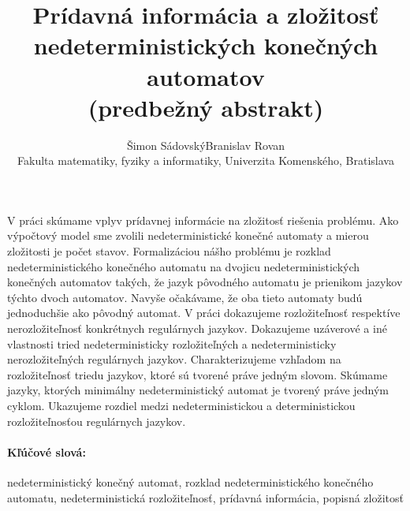 \documentclass[11pt,a4paper]{article}
\begin{document}
\thispagestyle{empty}

\title{\textbf{Prídavná informácia a zložitosť nedeterministických konečných automatov} \\ 
(predbežný abstrakt)}
\author{Šimon Sádovský\quad Branislav Rovan\\
Fakulta matematiky, fyziky a informatiky, Univerzita Komenského, Bratislava}
\date{} %
\maketitle\thispagestyle{empty} %

V práci skúmame vplyv prídavnej informácie na zložitosť riešenia problému. Ako výpočtový model sme zvolili nedeterministické konečné automaty a mierou zložitosti je počet stavov. Formalizáciou nášho problému je rozklad nedeterministického konečného automatu na dvojicu nedeterministických konečných automatov takých, že jazyk pôvodného automatu je prienikom jazykov týchto dvoch automatov. Navyše očakávame, že oba tieto automaty budú jednoduchšie ako pôvodný automat. V práci dokazujeme rozložiteľnosť respektíve nerozložiteľnosť konkrétnych regulárnych jazykov. Dokazujeme uzáverové a iné vlastnosti tried nedeterministicky rozložiteľných a nedeterministicky nerozložiteľných regulárnych jazykov. Charakterizujeme vzhľadom na rozložiteľnosť triedu jazykov, ktoré sú tvorené práve jedným slovom. Skúmame jazyky, ktorých minimálny nedeterministický automat je tvorený práve jedným cyklom. Ukazujeme rozdiel medzi nedeterministickou a deterministickou rozložiteľnosťou regulárnych jazykov.

\paragraph*{Kľúčové slová:} nedeterministický konečný automat, rozklad nedeterministického konečného automatu, nedeterministická rozložiteľnosť, prídavná informácia, popisná zložitosť
\end{document}
